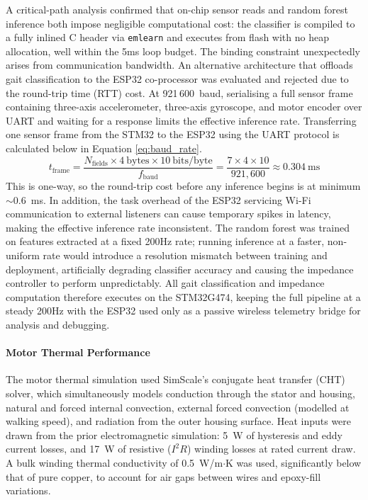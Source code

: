 \documentclass[11pt]{article}
\begin{document}
A critical-path analysis confirmed that on-chip sensor reads and random forest inference both impose negligible computational cost: the classifier is compiled to a fully inlined C header via \texttt{emlearn} and executes from flash with no heap allocation, well within the 5ms loop budget. 
The binding constraint unexpectedly arises from communication bandwidth. 
An alternative architecture that offloads gait classification to the ESP32 co-processor was evaluated and rejected due to the round-trip time (RTT) cost. 
At 921\,600~baud, serialising a full sensor frame containing three-axis accelerometer, three-axis gyroscope, and motor encoder over UART and waiting for a response limits the effective inference rate. 
Transferring one sensor frame from the STM32 to the ESP32 using the UART protocol is calculated below in Equation \ref{eq:baud_rate}.
\begin{equation}
    t_{\text{frame}} = \frac{N_{\text{fields}} \times 4~\text{bytes} \times 10~\text{bits/byte}}{f_{\text{baud}}} = \frac{7 \times 4 \times 10}{921{,}600} \approx 0.304~\text{ms}
    \label{eq:baud_rate}
\end{equation}
This is one-way, so the round-trip cost before any inference begins is at minimum $\sim$0.6~ms. In addition, the task overhead of the ESP32 servicing Wi-Fi communication to external listeners can cause temporary spikes in latency, making the effective inference rate inconsistent. The random forest was trained on features extracted at a fixed 200Hz rate; running inference at a faster, non-uniform rate would introduce a resolution mismatch between training and deployment, artificially degrading classifier accuracy and causing the impedance controller to perform unpredictably. All gait classification and impedance computation therefore executes on the STM32G474, 
keeping the full pipeline at a steady 200Hz with the ESP32 used only as a passive wireless telemetry bridge for analysis and debugging.

\paragraph{Motor Thermal Performance}

The motor thermal simulation used SimScale's conjugate heat transfer (CHT) solver, which simultaneously models conduction through the stator and housing, natural and forced internal convection, external forced convection (modelled at walking speed), and radiation from the outer housing surface. Heat inputs were drawn from the prior electromagnetic simulation: 5~W of hysteresis and eddy current losses, and 17~W of resistive ($I^2R$) winding losses at rated current draw. A bulk winding thermal conductivity of 0.5~W/m$\cdot$K was used, significantly below that of pure copper, to account for air gaps between wires and epoxy-fill variations.
\end{document}
